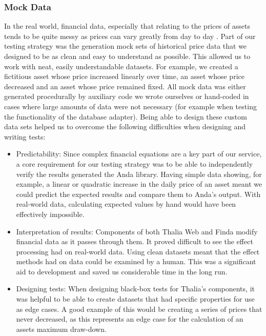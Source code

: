\documentclass[main.tex]{subfiles}
\begin{document}
\subsubsection{Mock Data}
In the real world, financial data, especially that relating to the prices of assets tends to be quite messy as prices can vary greatly from day to day \cite{bcIsVolatile}. Part of our testing strategy was the generation mock sets of historical price data that we designed to be as clean and easy to understand as possible. This allowed us to work with neat, easily understandable datasets. For example, we created a fictitious asset whose price increased linearly over time, an asset whose price decreased and an asset whose price remained fixed. All mock data was either generated procedurally by auxiliary code we wrote ourselves or hand-coded in cases where large amounts of data were not necessary (for example when testing the functionality of the database adapter). Being able to design these custom data sets helped us to overcome the following difficulties when designing and writing tests:

\begin{itemize}

\item Predictability:
Since complex financial equations are a key part of our service, a core requirement for our testing strategy was to be able to independently verify the results generated the Anda library. Having simple data showing, for example, a linear or quadratic increase in the daily price of an asset meant we could predict the expected results and compare them to Anda’s output. With real-world data, calculating expected values by hand would have been effectively impossible.

\item Interpretation of results:
Components of both Thalia Web and Finda modify financial data as it passes through them. It proved difficult to see the effect processing had on real-world data. Using clean datasets meant that the effect methods had on data could be examined by a human. This was a significant aid to development and saved us considerable time in the long run.

\item Designing tests:
When designing black-box tests for Thalia’s components, it was helpful to be able to create datasets that had specific properties for use as edge cases. A good example of this would be creating a series of prices that never decreased, as this represents an edge case for the calculation of an assets maximum draw-down.
\end{itemize}
\end{document}
